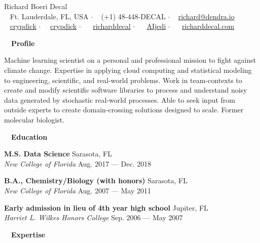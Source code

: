 \documentclass[a4paper,12pt]{article}
\newcommand{\resheading}[1]{{\hspace{-9pt} \colorbox{mygrey}{\begin{minipage}{\textwidth}{\textmd{~~\large \textbf{#1} \vphantom{p\^{E}}}}\end{minipage}}\vspace{6pt}} }
\newcommand{\ressubheading}[4]{{\begin{minipage}{\textwidth}
                                    \textbf{#1} \hfill #2 \\
                                    \textit{#3} \hfill #4 \\
\end{minipage}}}
\begin{document}
    \begin{center}
    {\Huge Richard Boeri Decal}
        \\
        {\small \faMapMarker~ Ft. Lauderdale, FL, USA $\cdot$ \faPhone~ (+1) 48-448-DECAL $\cdot$ \faEnvelope~ \href{mailto:richard@dendra.io}{richard@dendra.io}  \\ \faGithubAlt~ \href{https://github.com/crypdick}{crypdick} $\cdot$~\faStackOverflow~  \href{https://stackoverflow.com/users/4212158/crypdick}{crypdick} $\cdot$ ~\faLinkedin~ \href{https://www.linkedin.com/in/richarddecal/}{richarddecal}  $\cdot$ ~\faTwitter~ \href{https://twitter.com/AIjedi}{AIjedi}  $\cdot$ ~\faHome~  \href{https://www.richarddecal.com}{richarddecal.com}}
    \end{center}

    \resheading{Profile}

    Machine learning scientist on a personal and professional mission to fight against climate change.
    Expertise in applying cloud computing and statistical modeling to engineering, scientific, and real-world problems.
    Work in team-contexts to create and modify scientific software libraries to process and understand noisy data generated by stochastic real-world processes.
    Able to seek input from outside experts to create domain-crossing solutions designed to scale.
    Former molecular biologist.\\

    \resheading{Education}

    \ressubheading{M.S. Data Science}{Sarasota, FL}{New College of Florida}{Aug. 2017 --- Dec. 2018}



    \ressubheading{B.A., Chemistry/Biology (with honors)}{Sarasota, FL}{New College of Florida}{Aug. 2007 --- May 2011}

    \ressubheading{Early admission in lieu of 4th year high school}{Jupiter, FL}{Harriet L. Wilkes Honors College}{Sep. 2006 --- May 2007}


    \resheading{Expertise}
\end{document}
